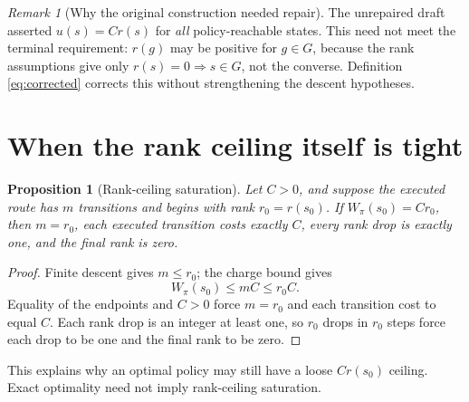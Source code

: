 \documentclass[11pt,letterpaper]{article}
\newtheorem{proposition}[theorem]{Proposition}
\theoremstyle{definition}\newtheorem{definition}[theorem]{Definition}\newtheorem{example}[theorem]{Example}
\theoremstyle{remark}\newtheorem{remark}[theorem]{Remark}
\begin{document}
\begin{remark}[Why the original construction needed repair]
The unrepaired draft asserted $u(s)=Cr(s)$ for \emph{all} policy-reachable states. This need not meet the terminal requirement: $r(g)$ may be positive for $g\in G$, because the rank assumptions give only $r(s)=0\Rightarrow s\in G$, not the converse. Definition \eqref{eq:corrected} corrects this without strengthening the descent hypotheses.
\end{remark}

\section{When the rank ceiling itself is tight}
\begin{proposition}[Rank-ceiling saturation]\label{prop:saturation}
Let $C>0$, and suppose the executed route has $m$ transitions and begins with rank $r_0=r(s_0)$. If $W_\pi(s_0)=Cr_0$, then $m=r_0$, each executed transition costs exactly $C$, every rank drop is exactly one, and the final rank is zero.
\end{proposition}
\begin{proof}
Finite descent gives $m\le r_0$; the charge bound gives
\[
 W_\pi(s_0)\le mC\le r_0C.
\]
Equality of the endpoints and $C>0$ force $m=r_0$ and each transition cost to equal $C$. Each rank drop is an integer at least one, so $r_0$ drops in $r_0$ steps force each drop to be one and the final rank to be zero.
\end{proof}
This explains why an optimal policy may still have a loose $Cr(s_0)$ ceiling. Exact optimality need not imply rank-ceiling saturation.
\end{document}
